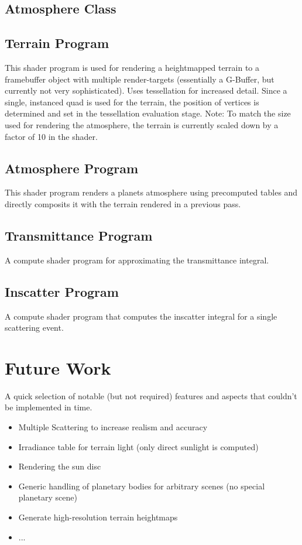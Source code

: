 \documentclass[12pt]{article}
\begin{document}
\subsection*{Atmosphere Class}
\subsection*{Terrain Program}
This shader program is used for rendering a heightmapped terrain to a framebuffer object with multiple render-targets (essentially a G-Buffer, but currently not very sophisticated).\newline
Uses tessellation for increased detail. Since a single, instanced quad is used for the terrain, the position of vertices is determined and set in the tessellation evaluation stage.\newline
Note: To match the size used for rendering the atmosphere, the terrain is currently scaled down by a factor of 10 in the shader.
\subsection*{Atmosphere Program}
This shader program renders a planets atmosphere using precomputed tables and directly composits it with the terrain rendered in a previous pass.
\subsection*{Transmittance Program}
A compute shader program for approximating the transmittance integral.
\subsection*{Inscatter Program}
A compute shader program that computes the inscatter integral for a single scattering event.

\section*{Future Work}
A quick selection of notable (but not required) features and aspects that couldn't be implemented in time.
\begin{itemize}
\item Multiple Scattering to increase realism and accuracy
\item Irradiance table for terrain light (only direct sunlight is computed)
\item Rendering the sun disc
\item Generic handling of planetary bodies for arbitrary scenes (no special planetary scene)
\item Generate high-resolution terrain heightmaps
\item ...
\end{itemize}
\end{document}
